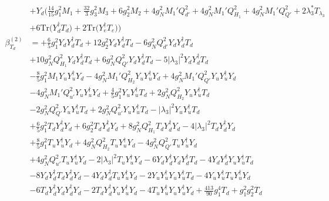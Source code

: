 {\begin{align}
 &+Y_d \Big(\frac{14}{15} g_{1}^{2} M_1 +\frac{32}{3} g_{3}^{2} M_3 +6 g_{2}^{2} M_2 +4 g_{N}^{2} M_1' Q_{d'}^{2} +4 g_{N}^{2} M_1' Q_{H_1}^{2} +4 g_{N}^{2} M_1' Q_{Q'}^{2} +2 \lambda_3^* T_{\lambda_3} \nonumber \\ 
 &+6 \mbox{Tr}\Big({Y_{d}^{\dagger}  T_d}\Big) +2 \mbox{Tr}\Big({Y_{e}^{\dagger}  T_e}\Big) \Big)\\ 
\beta_{T_d}^{(2)} & =  
+\frac{6}{5} g_{1}^{2} {Y_d  Y_{d}^{\dagger}  T_d} +12 g_{2}^{2} {Y_d  Y_{d}^{\dagger}  T_d} -6 g_{N}^{2} Q_{d'}^{2} {Y_d  Y_{d}^{\dagger}  T_d} \nonumber \\ 
 &+10 g_{N}^{2} Q_{H_1}^{2} {Y_d  Y_{d}^{\dagger}  T_d} +6 g_{N}^{2} Q_{Q'}^{2} {Y_d  Y_{d}^{\dagger}  T_d} -5 |\lambda_3|^2 {Y_d  Y_{d}^{\dagger}  T_d} \nonumber \\ 
 &-\frac{8}{5} g_{1}^{2} M_1 {Y_u  Y_{u}^{\dagger}  Y_d} -4 g_{N}^{2} M_1' Q_{H_2}^{2} {Y_u  Y_{u}^{\dagger}  Y_d} +4 g_{N}^{2} M_1' Q_{Q'}^{2} {Y_u  Y_{u}^{\dagger}  Y_d} \nonumber \\ 
 &-4 g_{N}^{2} M_1' Q_{u'}^{2} {Y_u  Y_{u}^{\dagger}  Y_d} +\frac{4}{5} g_{1}^{2} {Y_u  Y_{u}^{\dagger}  T_d} +2 g_{N}^{2} Q_{H_2}^{2} {Y_u  Y_{u}^{\dagger}  T_d} \nonumber \\ 
 &-2 g_{N}^{2} Q_{Q'}^{2} {Y_u  Y_{u}^{\dagger}  T_d} +2 g_{N}^{2} Q_{u'}^{2} {Y_u  Y_{u}^{\dagger}  T_d} - |\lambda_3|^2 {Y_u  Y_{u}^{\dagger}  T_d} \nonumber \\ 
 &+\frac{6}{5} g_{1}^{2} {T_d  Y_{d}^{\dagger}  Y_d} +6 g_{2}^{2} {T_d  Y_{d}^{\dagger}  Y_d} +8 g_{N}^{2} Q_{H_1}^{2} {T_d  Y_{d}^{\dagger}  Y_d} -4 |\lambda_3|^2 {T_d  Y_{d}^{\dagger}  Y_d} \nonumber \\ 
 &+\frac{8}{5} g_{1}^{2} {T_u  Y_{u}^{\dagger}  Y_d} +4 g_{N}^{2} Q_{H_2}^{2} {T_u  Y_{u}^{\dagger}  Y_d} -4 g_{N}^{2} Q_{Q'}^{2} {T_u  Y_{u}^{\dagger}  Y_d} \nonumber \\ 
 &+4 g_{N}^{2} Q_{u'}^{2} {T_u  Y_{u}^{\dagger}  Y_d} -2 |\lambda_3|^2 {T_u  Y_{u}^{\dagger}  Y_d} -6 {Y_d  Y_{d}^{\dagger}  Y_d  Y_{d}^{\dagger}  T_d} -4 {Y_d  Y_{d}^{\dagger}  Y_u  Y_{u}^{\dagger}  T_d} \nonumber \\ 
 &-8 {Y_d  Y_{d}^{\dagger}  T_d  Y_{d}^{\dagger}  Y_d} -4 {Y_d  Y_{d}^{\dagger}  T_u  Y_{u}^{\dagger}  Y_d} -2 {Y_u  Y_{u}^{\dagger}  Y_u  Y_{u}^{\dagger}  T_d} -4 {Y_u  Y_{u}^{\dagger}  T_u  Y_{u}^{\dagger}  Y_d} \nonumber \\ 
 &-6 {T_d  Y_{d}^{\dagger}  Y_d  Y_{d}^{\dagger}  Y_d} -2 {T_d  Y_{d}^{\dagger}  Y_u  Y_{u}^{\dagger}  Y_d} -4 {T_u  Y_{u}^{\dagger}  Y_u  Y_{u}^{\dagger}  Y_d} +\frac{413}{90} g_{1}^{4} T_d +g_{1}^{2} g_{2}^{2} T_d \nonumber \\ 

\end{align}}
